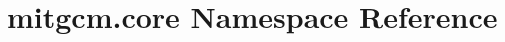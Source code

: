 \hypertarget{namespacemitgcm_1_1core}{\section{mitgcm.\+core Namespace Reference}
\label{namespacemitgcm_1_1core}
}
